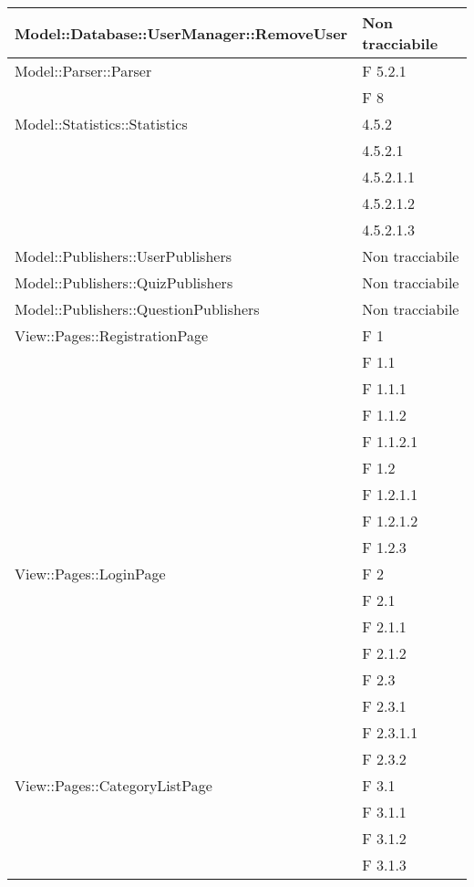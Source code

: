 \begin{longtable}{p{}p{}}
\midrule
Model::Database::UserManager::RemoveUser	& Non tracciabile\\

\midrule
Model::Parser::Parser		& F 5.2.1\\
							& F 8\\

\midrule
Model::Statistics::Statistics	& 4.5.2\\
								& 4.5.2.1\\
								& 4.5.2.1.1\\
								& 4.5.2.1.2\\
								& 4.5.2.1.3\\

\midrule
Model::Publishers::UserPublishers	& Non tracciabile\\

\midrule
Model::Publishers::QuizPublishers	& Non tracciabile\\

\midrule
Model::Publishers::QuestionPublishers	& Non tracciabile\\


\midrule
View::Pages::RegistrationPage	& F 1\\
								& F 1.1\\
								& F 1.1.1\\
								& F 1.1.2\\
								& F 1.1.2.1\\
								& F 1.2\\
								& F 1.2.1.1\\
								& F 1.2.1.2\\
								& F 1.2.3\\
\midrule
View::Pages::LoginPage			& F 2\\
								& F 2.1\\
								& F 2.1.1\\
								& F 2.1.2\\
								& F 2.3\\
								& F 2.3.1\\
								& F 2.3.1.1\\
								& F 2.3.2\\
								
\midrule
View::Pages::CategoryListPage					& F 3.1\\
								& F 3.1.1\\
								& F 3.1.2\\
								& F 3.1.3\\


\end{longtable}
